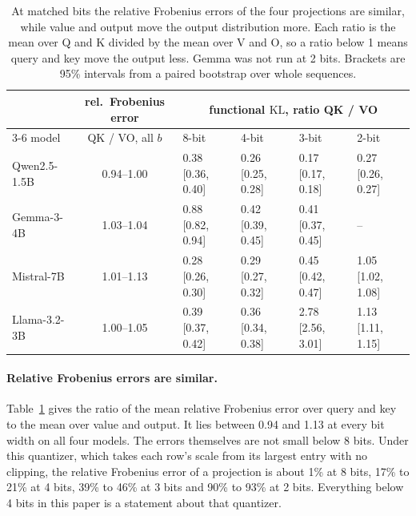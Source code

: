 \documentclass[journal]{IEEEtran}
\newcommand{\KL}{\mathrm{KL}}
\begin{document}
\begin{table}[t]
\centering
\caption{At matched bits the relative Frobenius errors of the four projections are similar,
while value and output move the output distribution more. Each ratio is the mean over Q and K
divided by the mean over V and O, so a ratio below 1 means query and key move the output less.
Gemma was not run at 2 bits. Brackets are 95\% intervals from a paired bootstrap over whole
sequences.}
\label{tab:proj}
\small
\setlength{\tabcolsep}{4pt}
\begin{tabular}{lcllll}
\toprule
 & rel.\ Frobenius error & \multicolumn{4}{c}{functional $\KL$, ratio QK / VO} \\
\cmidrule(lr){3-6}
model & QK / VO, all $b$ & 8-bit & 4-bit & 3-bit & 2-bit \\
\midrule
Qwen2.5-1.5B & 0.94--1.00 & 0.38 [0.36, 0.40] & 0.26 [0.25, 0.28] & 0.17 [0.17, 0.18] & 0.27 [0.26, 0.27] \\
Gemma-3-4B & 1.03--1.04 & 0.88 [0.82, 0.94] & 0.42 [0.39, 0.45] & 0.41 [0.37, 0.45] & -- \\
Mistral-7B & 1.01--1.13 & 0.28 [0.26, 0.30] & 0.29 [0.27, 0.32] & 0.45 [0.42, 0.47] & 1.05 [1.02, 1.08] \\
Llama-3.2-3B & 1.00--1.05 & 0.39 [0.37, 0.42] & 0.36 [0.34, 0.38] & 2.78 [2.56, 3.01] & 1.13 [1.11, 1.15] \\
\bottomrule
\end{tabular}
\end{table}

\paragraph{Relative Frobenius errors are similar.} Table~\ref{tab:proj} gives the ratio of the
mean relative Frobenius error over query and key to the mean over value and output. It lies
between 0.94 and 1.13 at every bit width on all four models. The errors themselves are not
small below 8 bits. Under this quantizer, which takes each row's scale from its largest entry
with no clipping, the relative Frobenius error of a projection is about 1\% at 8 bits, 17\% to
21\% at 4 bits, 39\% to 46\% at 3 bits and 90\% to 93\% at 2 bits. Everything below 4 bits in
this paper is a statement about that quantizer.
\end{document}
